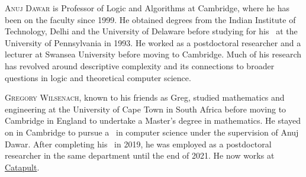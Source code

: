 \documentclass{toc}
\begin{document}
%
%
%
%
%
%
%
%
%
%
%
%
%
%
%
%
%
%
%
%
\begin{tocaboutauthors}
\begin{tocabout}[dawar]%
  \textsc{Anuj Dawar}  %
  is Professor of Logic and Algorithms at Cambridge, where he has been on the faculty since 1999.  He obtained degrees from the Indian Institute of Technology, Delhi and the University of Delaware before studying for his \phd\ at the University of Pennsylvania in 1993.  He worked as a %
postdoctoral  %
researcher and a lecturer at Swansea University before moving to Cambridge.  Much of his research has revolved around descriptive complexity and its connections to broader questions in logic and theoretical computer science.
\end{tocabout}
\begin{tocabout}[wilsenach]
\textsc{Gregory Wilsenach}, known to his friends as Greg, studied mathematics and engineering at the University of Cape Town in South Africa before moving to Cambridge in England to undertake a %
Master's  %
degree in mathematics.  He stayed on in Cambridge to pursue a \phd\ in computer science under the supervision of Anuj Dawar.  After completing his \phd\ in 2019, he was employed as a 
%
postdoctoral  %
researcher in the same department until the end of 2021.  He now works at \href{https://www.catapult.xyz}{Catapult}.
%
%
\end{tocabout}
\end{tocaboutauthors}
\end{document}
